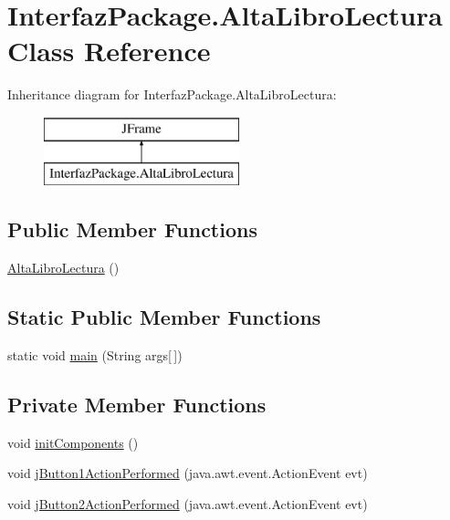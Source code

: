 \hypertarget{class_interfaz_package_1_1_alta_libro_lectura}{}\section{Interfaz\+Package.\+Alta\+Libro\+Lectura Class Reference}
\label{class_interfaz_package_1_1_alta_libro_lectura}
Inheritance diagram for Interfaz\+Package.\+Alta\+Libro\+Lectura\+:\begin{figure}[H]
\begin{center}
\leavevmode
\includegraphics[height=2.000000cm]{class_interfaz_package_1_1_alta_libro_lectura}
\end{center}
\end{figure}
\subsection*{Public Member Functions}
\begin{DoxyCompactItemize}
\item 
\mbox{\hyperlink{class_interfaz_package_1_1_alta_libro_lectura_ad5a9ed62b2923309a5aebfa87cebc4b2}{Alta\+Libro\+Lectura}} ()
\end{DoxyCompactItemize}
\subsection*{Static Public Member Functions}
\begin{DoxyCompactItemize}
\item 
static void \mbox{\hyperlink{class_interfaz_package_1_1_alta_libro_lectura_a1b635a9d4b17d8138049a4384963a884}{main}} (String args\mbox{[}$\,$\mbox{]})
\end{DoxyCompactItemize}
\subsection*{Private Member Functions}
\begin{DoxyCompactItemize}
\item 
void \mbox{\hyperlink{class_interfaz_package_1_1_alta_libro_lectura_a7355e006e518b1bfec8c9b89fb1a4430}{init\+Components}} ()
\item 
void \mbox{\hyperlink{class_interfaz_package_1_1_alta_libro_lectura_a4e1677bb3bfc8c979526999d21973269}{j\+Button1\+Action\+Performed}} (java.\+awt.\+event.\+Action\+Event evt)
\item 
void \mbox{\hyperlink{class_interfaz_package_1_1_alta_libro_lectura_a2e75097b1dde02511d6f9209ee624e73}{j\+Button2\+Action\+Performed}} (java.\+awt.\+event.\+Action\+Event evt)
\end{DoxyCompactItemize}

